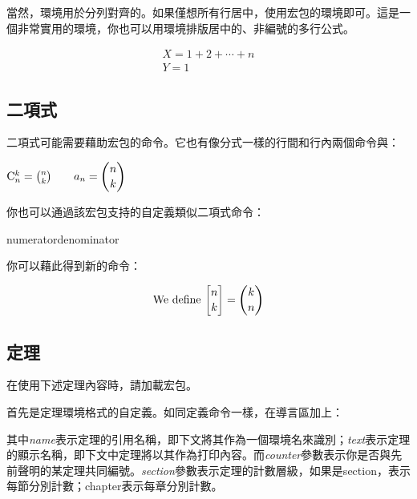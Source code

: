 當然，環境用於分列對齊的。如果僅想所有行居中，使用宏包的環境即可。這是一個非常實用的環境，你也可以用環境排版居中的、非編號的多行公式。

\begin{codeshow}
\begin{gather}
  X=1+2+\cdots+n \\
  Y=1
\end{gather}
\end{codeshow}

\subsection{二項式}
\label{subsec:binom}
二項式可能需要藉助宏包的命令。它也有像分式一樣的行間和行內兩個命令與：

\begin{codeshow}
$\mathrm{C}_n^k=\binom{n}{k}
\qquad a_n=\dbinom{n}{k}$
\end{codeshow}

你也可以通過該宏包支持的自定義類似二項式命令：
\begin{latex}
{numerator}{denominator}
\newcommand{\Bfrac}[2]{\genfrac{[}{]}{0pt}{}{#1}{#2}}
\end{latex}

你可以藉此得到新的命令：
\begin{codeshow}
\[\text{We define } \Bfrac{n}{k} = \binom{k}{n}\]
\end{codeshow}

\subsection{定理}
在使用下述定理內容時，請加載宏包。

首先是定理環境格式的自定義。如同定義命令一樣，在導言區加上：
\begin{latex}
\newtheorem{envname}[counter]{text}[section]
\end{latex}

其中\textit{name}表示定理的引用名稱，即下文將其作為一個環境名來識別；\textit{text}表示定理的顯示名稱，即下文中定理將以其作為打印內容。而\textit{counter}參數表示你是否與先前聲明的某定理共同編號。\textit{section}參數表示定理的計數層級，如果是section，表示每節分別計數；chapter表示每章分別計數。

